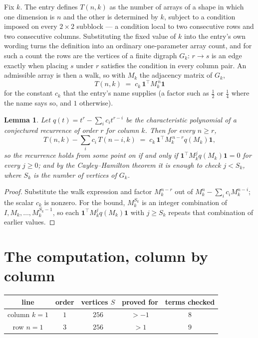 \documentclass[11pt,a4paper]{article}
\theoremstyle{plain}
\newtheorem{lemma}[theorem]{Lemma}
\theoremstyle{definition}
\begin{document}
Fix $k$. The entry defines $T(n,k)$ as the number of arrays of a shape in which one dimension
is $n$ and the other is determined by $k$, subject to a condition imposed on every
$2\times2$ subblock --- a condition local to two consecutive rows and two consecutive columns.
Substituting the fixed value of $k$ into the entry's own wording turns the definition into an
ordinary one-parameter array count, and for such a count the rows are the vertices of a finite
digraph $G_k$: $r\to s$ is an edge exactly when placing $s$ under $r$ satisfies the condition
in every column pair. An admissible array is then a walk, so with $M_k$ the adjacency matrix
of $G_k$,
\[
T(n,k)\;=\;c_k\,\mathbf{1}^{\!\top}M_k^{\,n}\mathbf{1}
\]
for the constant $c_k$ that the entry's name supplies (a factor such as $\tfrac12$ or
$\tfrac14$ where the name says so, and $1$ otherwise).

\begin{lemma}\label{lem:crit}
Let $q(t)=t^{r}-\sum_i c_it^{r-i}$ be the characteristic polynomial of a conjectured
recurrence of order $r$ for column $k$. Then for every $n\ge r$,
\[
T(n,k)-\sum_i c_i\,T(n-i,k)\;=\;c_k\,\mathbf{1}^{\!\top}M_k^{\,n-r}q(M_k)\mathbf{1},
\]
so the recurrence holds from some point on if and only if
$\mathbf{1}^{\!\top}M_k^{j}q(M_k)\mathbf{1}=0$ for every $j\ge0$; and by the
Cayley--Hamilton theorem it is enough to check $j<S_k$, where $S_k$ is the number of vertices
of $G_k$.
\end{lemma}

\begin{proof}
Substitute the walk expression and factor $M_k^{n-r}$ out of $M_k^{n}-\sum_ic_iM_k^{n-i}$;
the scalar $c_k$ is nonzero. For the bound, $M_k^{S_k}$ is an integer combination of
$I,M_k,\dots,M_k^{S_k-1}$, so each $\mathbf{1}^{\!\top}M_k^{j}q(M_k)\mathbf{1}$ with
$j\ge S_k$ repeats that combination of earlier values.
\end{proof}

\section{The computation, column by column}

\begin{center}
\begin{tabular}{ccccc}
line & order & vertices $S$ & proved for & terms checked \\ \hline
column $k$$=1$ & $1$ & $256$ & $>-1$ & $8$ \\
row $n$$=1$ & $3$ & $256$ & $>1$ & $9$ \\
\end{tabular}
\end{center}
\end{document}

